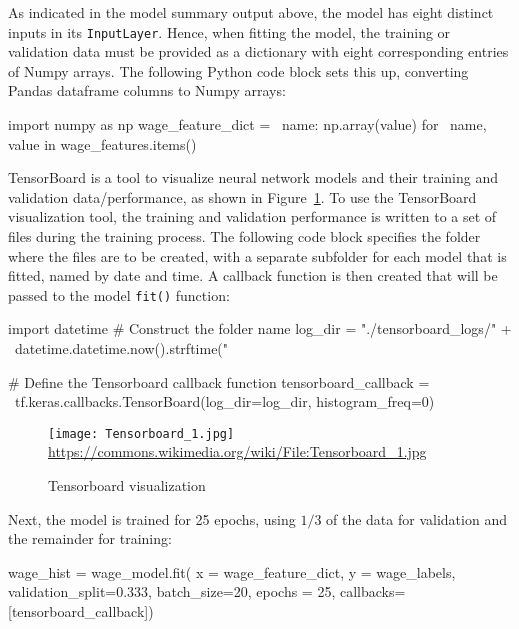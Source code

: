 As indicated in the model summary output above, the model has eight distinct inputs in its \texttt{InputLayer}. Hence, when fitting the model, the training or validation data must be provided as a dictionary with eight corresponding entries of Numpy arrays. The following Python code block sets this up, converting Pandas dataframe columns to Numpy arrays:

\begin{samepage}
\begin{pythoncode}
import numpy as np
wage_feature_dict = \
    {name: np.array(value) for \
        name, value in wage_features.items()}
\end{pythoncode}
\end{samepage}

TensorBoard is a tool to visualize neural network models and their training and validation data/performance, as shown in Figure~\ref{fig:tensorboard}. To use the TensorBoard visualization tool, the training and validation performance is written to a set of files during the training process. The following code block specifies the folder where the files are to be created, with a separate subfolder for each model that is fitted, named by date and time. A callback function is then created that will be passed to the model \texttt{fit()} function:

\begin{samepage}
\begin{pythoncode}
import datetime
# Construct the folder name
log_dir = "./tensorboard_logs/" + \
    datetime.datetime.now().strftime("%
    
# Define the Tensorboard callback function
tensorboard_callback = \
    tf.keras.callbacks.TensorBoard(log_dir=log_dir, histogram_freq=0)
\end{pythoncode}
\end{samepage}

\begin{figure}
\centering
\texttt{[image: Tensorboard\_1.jpg]} \\

\scriptsize \url{https://commons.wikimedia.org/wiki/File:Tensorboard_1.jpg}
\caption{Tensorboard visualization}
\label{fig:tensorboard}
\end{figure}

Next, the model is trained for 25 epochs, using $1/3$ of the data for validation and the remainder for training:

\begin{samepage}
\begin{pythoncode}
wage_hist = wage_model.fit(
    x = wage_feature_dict,
    y = wage_labels,
    validation_split=0.333,
    batch_size=20,
    epochs = 25,
    callbacks=[tensorboard_callback])
\end{pythoncode}
\end{samepage}

